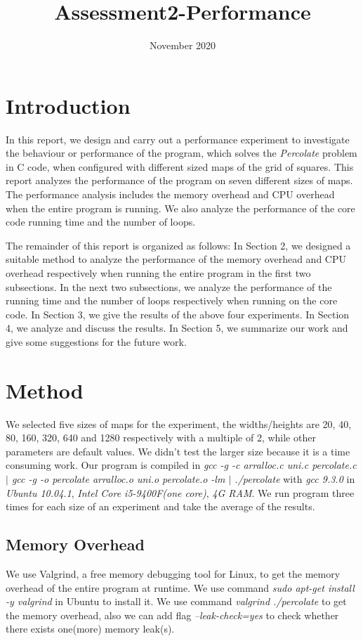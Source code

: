 \documentclass{article}
\title{Assessment2-Performance}
\date{November 2020}
\begin{document}
\maketitle
\tableofcontents
\section{Introduction}

In this report, we design and carry out a performance experiment to investigate the behaviour or performance of the program, which solves the \emph{Percolate} problem in C code, when configured with different sized maps of the grid of squares. This report analyzes the performance of the program on seven different sizes of maps. The performance analysis includes the memory overhead and CPU overhead when the entire program is running. We also analyze the performance of the core code running time and the number of loops.

The remainder of this report is organized as follows: In Section 2, we designed a suitable method to analyze the performance of the memory overhead and CPU overhead respectively when running the entire program in the first two subsections. In the next two subsections, we analyze the performance of the running time and the number of loops respectively when running on the core code. In Section 3, we give the results of the above four experiments. In Section 4, we analyze and discuss the results. In Section 5, we summarize our work and give some suggestions for the future work. 

\section{Method}

We selected five sizes of maps for the experiment, the widths/heights are 20, 40, 80, 160, 320, 640 and 1280 respectively with a multiple of 2, while other parameters are default values. We didn't test the larger size because it is a time consuming work. Our program is compiled in \emph{gcc -g -c arralloc.c uni.c percolate.c $\mid$ gcc -g -o percolate arralloc.o uni.o percolate.o -lm $\mid$ ./percolate} with \emph{gcc 9.3.0} in \emph{Ubuntu 10.04.1}, \emph{Intel Core i5-9400F(one core)}, \emph{4G RAM}. We run program three times for each size of an experiment and take the average of the results.

\subsection{Memory Overhead}
We use Valgrind, a free memory debugging tool for Linux, to get the memory overhead of the entire program at runtime. We use command \emph{sudo apt-get install -y valgrind} in Ubuntu to install it. We use command \emph{valgrind ./percolate} to get the memory overhead, also we can add flag \emph{--leak-check=yes} to check whether there exists one(more) memory leak(s).
\end{document}
